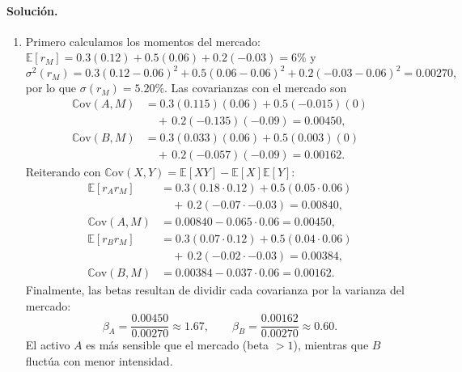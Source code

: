 \documentclass[12pt,a4paper]{article}
\newcommand{\E}{\mathbb{E}}
\newcommand{\Cov}{\mathbb{C}\text{ov}}
\newenvironment{solucion}{\paragraph{Solución.}}{}
\begin{document}
\begin{solucion}
\begin{enumerate}[label=\alph*)]
  \item Primero calculamos los momentos del mercado: $\E[r_M] = 0.3(0.12) + 0.5(0.06) + 0.2(-0.03) = 6\%$ y
  \[
  \sigma^2(r_M) = 0.3(0.12-0.06)^2 + 0.5(0.06-0.06)^2 + 0.2(-0.03-0.06)^2 = 0.00270,
  \]
  por lo que $\sigma(r_M) = 5.20\%$. Las covarianzas con el mercado son
  \begin{align*}
  \Cov(A,M) &= 0.3(0.115)(0.06) + 0.5(-0.015)(0) \\
                  &\quad +\, 0.2(-0.135)(-0.09) = 0.00450,\\
  \Cov(B,M) &= 0.3(0.033)(0.06) + 0.5(0.003)(0) \\
                  &\quad +\, 0.2(-0.057)(-0.09) = 0.00162.
  \end{align*}
  Reiterando con $\Cov(X,Y) = \E[XY] - \E[X]\E[Y]$:
  \begin{align*}
  \E[r_A r_M] &= 0.3(0.18\cdot0.12) + 0.5(0.05\cdot0.06) \\
              &\quad +\, 0.2(-0.07\cdot-0.03) = 0.00840,\\
  \Cov(A,M) &= 0.00840 - 0.065\cdot0.06 = 0.00450,
  \end{align*}
  \begin{align*}
  \E[r_B r_M] &= 0.3(0.07\cdot0.12) + 0.5(0.04\cdot0.06) \\
              &\quad +\, 0.2(-0.02\cdot-0.03) = 0.00384,\\
  \Cov(B,M) &= 0.00384 - 0.037\cdot0.06 = 0.00162.
  \end{align*}
  Finalmente, las betas resultan de dividir cada covarianza por la varianza del mercado:
  \[
  \beta_A = \frac{0.00450}{0.00270} \approx 1.67,\qquad
  \beta_B = \frac{0.00162}{0.00270} \approx 0.60.
  \]
  El activo $A$ es más sensible que el mercado (beta $>1$), mientras que $B$ fluctúa con menor intensidad.
\end{enumerate}
\end{solucion}
\end{document}

